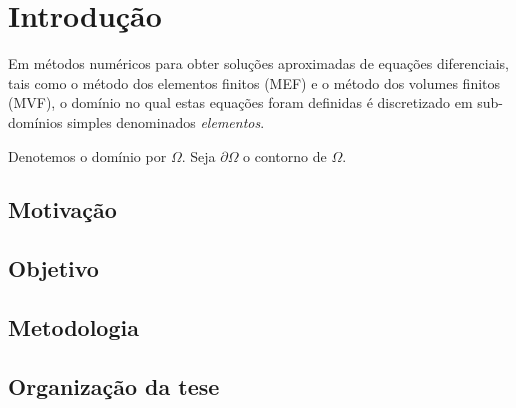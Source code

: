 \chapter{Introdução}

Em métodos numéricos para obter soluções aproximadas de equações diferenciais,
tais como o método dos elementos finitos (MEF) e o método dos volumes finitos
(MVF), o domínio no qual estas equações foram definidas é discretizado em
sub-domínios simples denominados \textit{elementos}.%
%

Denotemos o domínio por $\Omega$. Seja $\partial \Omega$ o contorno de
$\Omega$.%
%

\section{Motivaç{\~ a}o}

\section{Objetivo}

\section{Metodologia}

\section{Organizaç{\~ a}o da tese}

